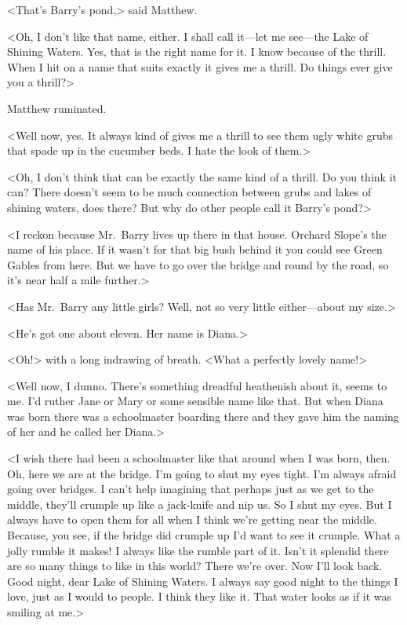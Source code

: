 <That's Barry's pond,> said Matthew.

<Oh, I don't like that name, either. I shall call it—let me see—the Lake of Shining Waters. Yes, that is the right name for it. I know because of the thrill. When I hit on a name that suits exactly it gives me a thrill. Do things ever give you a thrill?>

Matthew ruminated.

<Well now, yes. It always kind of gives me a thrill to see them ugly white grubs that spade up in the cucumber beds. I hate the look of them.>

<Oh, I don't think that can be exactly the same kind of a thrill. Do you think it can? There doesn't seem to be much connection between grubs and lakes of shining waters, does there? But why do other people call it Barry's pond?>

<I reckon because Mr.~Barry lives up there in that house. Orchard Slope's the name of his place. If it wasn't for that big bush behind it you could see Green Gables from here. But we have to go over the bridge and round by the road, so it's near half a mile further.>

<Has Mr.~Barry any little girls? Well, not so very little either—about my size.>

<He's got one about eleven. Her name is Diana.>

<Oh!> with a long indrawing of breath. <What a perfectly lovely name!>

<Well now, I dunno. There's something dreadful heathenish about it, seems to me. I'd ruther Jane or Mary or some sensible name like that. But when Diana was born there was a schoolmaster boarding there and they gave him the naming of her and he called her Diana.>

<I wish there had been a schoolmaster like that around when I was born, then. Oh, here we are at the bridge. I'm going to shut my eyes tight. I'm always afraid going over bridges. I can't help imagining that perhaps just as we get to the middle, they'll crumple up like a jack-knife and nip us. So I shut my eyes. But I always have to open them for all when I think we're getting near the middle. Because, you see, if the bridge did crumple up I'd want to see it crumple. What a jolly rumble it makes! I always like the rumble part of it. Isn't it splendid there are so many things to like in this world? There we're over. Now I'll look back. Good night, dear Lake of Shining Waters. I always say good night to the things I love, just as I would to people. I think they like it. That water looks as if it was smiling at me.>


